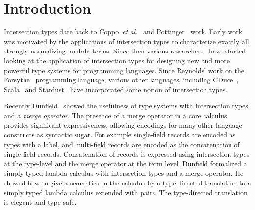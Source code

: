 \section{Introduction}
\label{sec:intro}

Intersection types date back to Coppo~\textit{et
  al.}~\cite{coppo1981functional} and Pottinger~\cite{Pottinger80type}
work. Early work was motivated by the applications of
intersection types to characterize exactly all strongly normalizing
lambda terms.
Since then various researchers~\cite{Freeman91refinement,pierce1991programming1,Castagna92calculus,pierce1997intersection,davies2000intersection,Dunfield03Intersections} have started looking at the application
of intersection types for designing new and more powerful type systems 
for programming languages. Since Reynolds' work on the Forsythe~\cite{reynolds1997design}
programming language, various other languages, including
CDuce~\cite{Benzaken03cduce}, Scala~\cite{scala-overview} and 
Stardust~\cite{Dunfield07:Stardust} have incorporated some notion 
of intersection types.

Recently Dunfield~\cite{dunfield2014elaborating} showed the
usefulness of type systems with intersection types and a \emph{merge operator}. The presence of a merge
operator in a core calculus provides significant expressiveness, allowing
encodings for many other language constructs as syntactic sugar. For example
single-field records are encoded as types with a label, and multi-field
records are encoded as the concatenation of single-field records. Concatenation
of records is expressed using intersection types at the type-level and the
merge operator at the term level. Dunfield formalized a simply
typed lambda calculus with intersection types and a merge operator. He showed
how to give a semantics to the calculus by a type-directed translation to a
simply typed lambda calculus extended with pairs. The type-directed translation
is elegant and type-safe.

